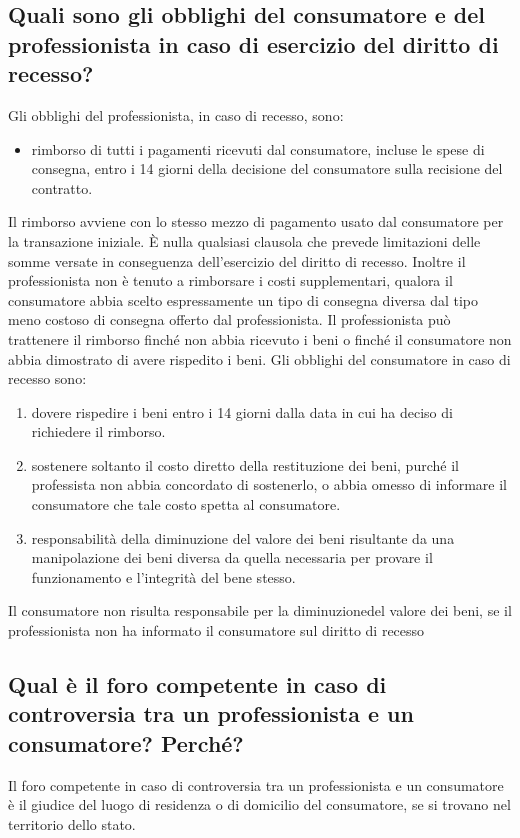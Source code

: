 \subsection{Quali sono gli obblighi del consumatore e del professionista in caso di
esercizio del diritto di recesso?}
Gli obblighi del professionista, in caso di recesso, sono:
\begin{itemize}
    \item rimborso di tutti i pagamenti ricevuti dal consumatore, incluse le spese di
        consegna, entro i 14 giorni della decisione del consumatore sulla recisione del
        contratto.
\end{itemize}
Il rimborso avviene con lo stesso mezzo di pagamento usato dal consumatore per la
transazione iniziale.
È nulla qualsiasi clausola che prevede limitazioni delle somme versate in conseguenza
dell'esercizio del diritto di recesso.
Inoltre il professionista non è tenuto a rimborsare i costi supplementari, qualora il
consumatore abbia scelto espressamente un tipo di consegna diversa dal tipo meno costoso
di consegna offerto dal professionista.
Il professionista può trattenere il rimborso finché non abbia ricevuto i beni o finché il
consumatore non abbia dimostrato di avere rispedito i beni.
\newline
\newline
Gli obblighi del consumatore in caso di recesso sono:
\begin{enumerate}
    \item dovere rispedire i beni entro i 14 giorni dalla data in cui ha deciso di richiedere il rimborso.
    \item sostenere soltanto il costo diretto della restituzione dei beni, purché il
        professista non abbia concordato di sostenerlo, o abbia omesso di informare il
        consumatore che tale costo spetta al consumatore.
    \item responsabilità della diminuzione del valore dei beni risultante da una
        manipolazione dei beni diversa da quella necessaria per provare il funzionamento e
        l'integrità del bene stesso.
\end{enumerate}
Il consumatore non risulta responsabile per la diminuzionedel valore dei beni, se il
professionista non ha informato il consumatore sul diritto di recesso

\subsection{Qual è il foro competente in caso di controversia tra un professionista e un consumatore?
Perché?}
Il foro competente in caso di controversia tra un professionista e un consumatore è il
giudice del luogo di residenza o di domicilio del consumatore, se si trovano nel
territorio dello stato.
